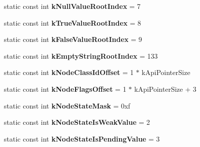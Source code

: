 \begin{DoxyCompactItemize}
\item 
\hypertarget{classv8_1_1internal_1_1_internals_ab311cf753ec5c968052bd83ef21e83f8}{}static const int {\bfseries k\+Null\+Value\+Root\+Index} = 7\label{classv8_1_1internal_1_1_internals_ab311cf753ec5c968052bd83ef21e83f8}

\item 
\hypertarget{classv8_1_1internal_1_1_internals_a93abd58b178eca469bade28e68b5c59e}{}static const int {\bfseries k\+True\+Value\+Root\+Index} = 8\label{classv8_1_1internal_1_1_internals_a93abd58b178eca469bade28e68b5c59e}

\item 
\hypertarget{classv8_1_1internal_1_1_internals_a90b6837aa368bbe4ffd914e6f753b167}{}static const int {\bfseries k\+False\+Value\+Root\+Index} = 9\label{classv8_1_1internal_1_1_internals_a90b6837aa368bbe4ffd914e6f753b167}

\item 
\hypertarget{classv8_1_1internal_1_1_internals_a6f669f3d98fe653b281b26be3bc0655a}{}static const int {\bfseries k\+Empty\+String\+Root\+Index} = 133\label{classv8_1_1internal_1_1_internals_a6f669f3d98fe653b281b26be3bc0655a}

\item 
\hypertarget{classv8_1_1internal_1_1_internals_af4fb6d499cb87f03031ad4d6be6bcd8f}{}static const int {\bfseries k\+Node\+Class\+Id\+Offset} = 1 $\ast$ k\+Api\+Pointer\+Size\label{classv8_1_1internal_1_1_internals_af4fb6d499cb87f03031ad4d6be6bcd8f}

\item 
\hypertarget{classv8_1_1internal_1_1_internals_aee5606f2a44d43d8dafe344e0bb753ef}{}static const int {\bfseries k\+Node\+Flags\+Offset} = 1 $\ast$ k\+Api\+Pointer\+Size + 3\label{classv8_1_1internal_1_1_internals_aee5606f2a44d43d8dafe344e0bb753ef}

\item 
\hypertarget{classv8_1_1internal_1_1_internals_a853acc088978d38a5a69091cf857a46d}{}static const int {\bfseries k\+Node\+State\+Mask} = 0xf\label{classv8_1_1internal_1_1_internals_a853acc088978d38a5a69091cf857a46d}

\item 
\hypertarget{classv8_1_1internal_1_1_internals_a8a5d4cc92a6952c2a50922c77a606e68}{}static const int {\bfseries k\+Node\+State\+Is\+Weak\+Value} = 2\label{classv8_1_1internal_1_1_internals_a8a5d4cc92a6952c2a50922c77a606e68}

\item 
\hypertarget{classv8_1_1internal_1_1_internals_a843b53b17257ecd957eade0d9f21c5ab}{}static const int {\bfseries k\+Node\+State\+Is\+Pending\+Value} = 3\label{classv8_1_1internal_1_1_internals_a843b53b17257ecd957eade0d9f21c5ab}


\end{DoxyCompactItemize}

